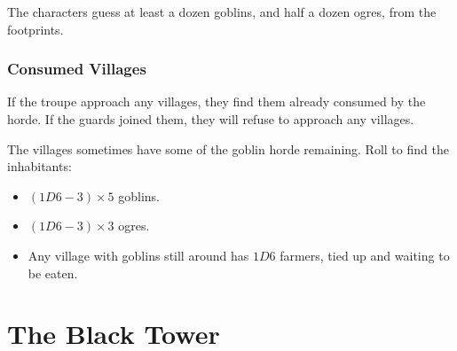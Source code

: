 \begin{multicols}{2}
The characters guess at least a dozen goblins, and half a dozen ogres, from the footprints.

\subsubsection{Consumed Villages}

If the troupe approach any villages, they find them already consumed by the horde.
If the \glspl{guard} joined them, they will refuse to approach any villages.

The villages sometimes have some of the goblin horde remaining.
Roll to find the inhabitants:

\begin{itemize}
  \item
  $(1D6 - 3)\times 5$ goblins.
  \item
  $(1D6 - 3)\times 3$ ogres.
  \item
  Any village with goblins still around has $1D6$ farmers, tied up and waiting to be eaten.
\end{itemize}

\end{multicols}

\section{The Black Tower}

